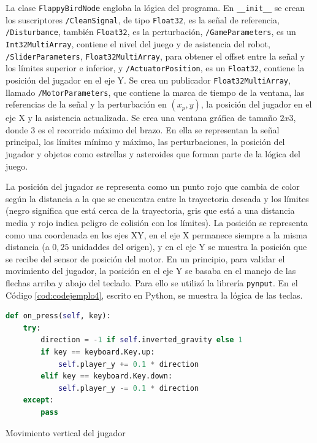 La clase \verb|FlappyBirdNode| engloba la lógica del programa.
En \verb|__init__| se crean los suscriptores \verb|/CleanSignal|, de tipo \verb|Float32|, es la señal de referencia, \verb|/Disturbance|, también \verb|Float32|, es la perturbación, \verb|/GameParameters|, es un \verb|Int32MultiArray|, contiene el nivel del juego y de asistencia del robot, \verb|/SliderParameters|, \verb|Float32MultiArray|, para obtener el offset entre la señal y los límites superior e inferior, y \verb|/ActuatorPosition|, es un \verb|Float32|, contiene la posición del jugador en el eje Y.
Se crea un publicador \verb|Float32MultiArray|, llamado \verb|/MotorParameters|, que contiene la marca de tiempo de la ventana, las referencias de la señal y la perturbación en $(x_p, y)$, la posición del jugador en el eje X y la asistencia actualizada.
Se crea una ventana gráfica de tamaño $2x3$, donde 3 es el recorrido máximo del brazo.
En ella se representan la señal principal, los límites mínimo y máximo, las perturbaciones, la posición del jugador y objetos como estrellas y asteroides que forman parte de la lógica del juego.

La posición del jugador se representa como un punto rojo que cambia de color según la distancia a la que se encuentra entre la trayectoria deseada y los límites (negro significa que está cerca de la trayectoria, gris que está a una distancia media y rojo indica peligro de colisión con los límites).
La posición se representa como una coordenada en los ejes XY, en el eje X permanece siempre a la misma distancia (a $0,25$ unidaddes del origen), y en el eje Y se muestra la posición que se recibe del sensor de posición del motor.
En un principio, para validar el movimiento del jugador, la posición en el eje Y se basaba en el manejo de las flechas arriba y abajo del teclado.
Para ello se utilizó la librería \verb|pynput|.
En el Código \ref{cod:codejemplo4}, escrito en Python, se muestra la lógica de las teclas.

\begin{code}[h]
\begin{lstlisting}[language=Python]
def on_press(self, key):
	try:
		direction = -1 if self.inverted_gravity else 1
		if key == keyboard.Key.up:
			self.player_y += 0.1 * direction
		elif key == keyboard.Key.down:
			self.player_y -= 0.1 * direction
	except:
		pass
\end{lstlisting}
\caption[Movimiento vertical del jugador]{Movimiento vertical del jugador}
\label{cod:codejemplo4}
\end{code}

